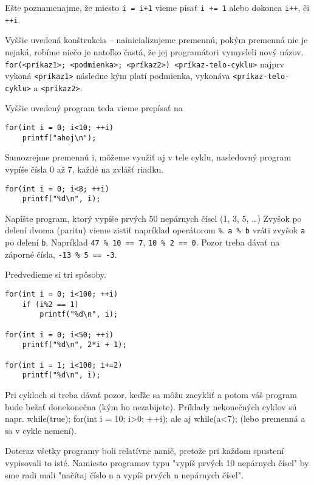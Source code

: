 Ešte poznamenajme, že miesto \verb!i = i+1! vieme písať \verb!i += 1! alebo
dokonca \verb!i++!, či \verb!++i!.

\medskip

Vyššie uvedená konštrukcia -- nainicializujeme premennú, pokým premenná nie je
nejaká, robíme niečo je natoľko častá, že jej programátori vymysleli nový
názov. \verb!for(<príkaz1>; <podmienka>; <príkaz2>) <príkaz-telo-cyklu>! najprv
vykoná \verb!<príkaz1>! následne kým platí podmienka, vykonáva
\verb!<príkaz-telo-cyklu>! a \verb!<príkaz2>!.

Vyššie uvedený program teda vieme prepísať na
\begin{lstlisting}
for(int i = 0; i<10; ++i)
    printf("ahoj\n");
\end{lstlisting}

Samozrejme premennú i, môžeme využiť aj v tele cyklu, nasledovný program vypíše
čísla 0 až 7, každé na zvlášť riadku.
\begin{lstlisting}
for(int i = 0; i<8; ++i)
    printf("%d\n", i);
\end{lstlisting}

\cvicenie Napíšte program, ktorý vypíše prvých 50 nepárnych čísel (1, 3,
5, \dots) Zvyšok po delení dvoma (paritu) vieme zistiť napríklad operátorom \verb!%!.
\verb!a % b! vráti zvyšok \verb!a! po delení \verb!b!. Napríklad \verb!47 % 10 == 7!, \verb!10 % 2 == 0!.
Pozor treba dávať na záporné čísla, \verb!-13 % 5 == -3!.

\riesenie Predvedieme si tri spôsoby. 
\begin{lstlisting}
for(int i = 0; i<100; ++i)
    if (i%2 == 1)
        printf("%d\n", i);

for(int i = 0; i<50; ++i)
    printf("%d\n", 2*i + 1);

for(int i = 1; i<100; i+=2)
    printf("%d\n", i);
\end{lstlisting}

Pri cykloch si treba dávať pozor, keďže sa môžu zacykliť a potom váš program bude bežať donekonečna (kým ho nezabijete).
Príklady nekonečných cyklov sú napr. while(true); for(int i = 10; i>0; ++i); ale aj while(a<7); 
(lebo premenná a sa v cykle nemení).



Doteraz všetky programy boli relatívne nanič, pretože pri každom spustení vypisovali to isté.
Namiesto programov typu "vypíš prvých 10 nepárnych čísel" by sme radi mali "načítaj číslo n a vypíš prvých n nepárnych čísel".

